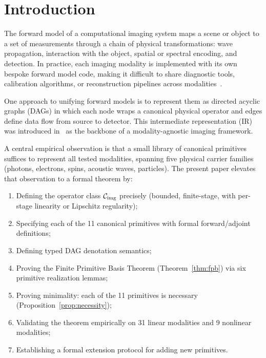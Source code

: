 \documentclass[11pt]{article}
\begin{document}
\section{Introduction}
\label{sec:intro}

The forward model of a computational imaging system maps a scene or object to a set of measurements through a chain of physical transformations: wave propagation, interaction with the object, spatial or spectral encoding, and detection. In practice, each imaging modality is implemented with its own bespoke forward model code, making it difficult to share diagnostic tools, calibration algorithms, or reconstruction pipelines across modalities~\cite{ongie2020deep,monga2021unrolling}.

One approach to unifying forward models is to represent them as directed acyclic graphs (DAGs) in which each node wraps a canonical physical operator and edges define data flow from source to detector. This \opg{} intermediate representation (IR) was introduced in~\cite{yang2026pwm} as the backbone of a modality-agnostic imaging framework.

A central empirical observation is that a small library of canonical primitives suffices to represent all tested modalities, spanning five physical carrier families (photons, electrons, spins, acoustic waves, particles). The present paper elevates that observation to a formal theorem by:

\begin{enumerate}
  \item Defining the operator class $\mathcal{C}_{\mathrm{img}}$ precisely (bounded, finite-stage, with per-stage linearity or Lipschitz regularity);
  \item Specifying each of the 11 canonical primitives with formal forward/adjoint definitions;
  \item Defining typed DAG denotation semantics;
  \item Proving the Finite Primitive Basis Theorem (Theorem~\ref{thm:fpb}) via six primitive realization lemmas;
  \item Proving minimality: each of the 11 primitives is necessary (Proposition~\ref{prop:necessity});
  \item Validating the theorem empirically on 31 linear modalities and 9 nonlinear modalities;
  \item Establishing a formal extension protocol for adding new primitives.
\end{enumerate}
\end{document}
